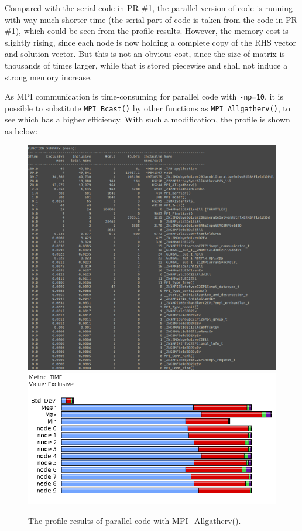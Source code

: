 \documentclass{article}
\begin{document}
\begin{spacing}{1.1}
Compared with the serial code in PR \#1, the parallel version of code is running with way much shorter time (the serial part of code is taken from the code in PR \#1), which could be seen from the profile results. However, the memory cost is slightly rising, since each node is now holding a complete copy of the RHS vector and solution vector. But this is not an obvious cost, since the size of matrix is thousands of times larger, while that is stored piecewise and shall not induce a strong memory increase.

As MPI communication is time-consuming for parallel code with \texttt{-np=10}, it is possible to substitute \texttt{MPI\_Bcast()} by other functions as \texttt{MPI\_Allgatherv()}, to see which has a higher efficiency. With such a modification, the profile is shown as below:

\begin{figure}[H]
  \centering
  \includegraphics[width=\linewidth]{output/mpi-gather-text.png}
  \includegraphics[width=0.6\linewidth]{output/mpi-gather.png}
  \caption{The profile results of parallel code with MPI\_Allgatherv().}
  \label{fig-testcase}
\end{figure}


\end{spacing}
\end{document}
